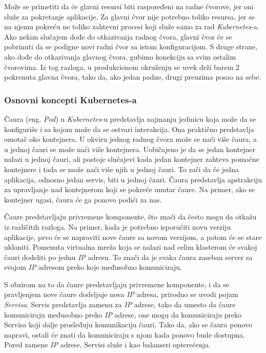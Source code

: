 Može se primetiti da će glavni resursi biti raspoređeni na radne čvorove, jer oni služe za pokretanje 
aplikacije. Za glavni čvor nije potrebno toliko resursa, jer se na njemu pokreću ne toliko zahtevni procesi 
koji služe samo za rad \textit{Kubernetes}-a. Ako nekim slučajem dođe do otkazivanja radnog čvora, glavni čvor 
će se pobrinuti da se podigne novi radni čvor sa istom konfiguracijom. S druge strane, ako dođe do 
otkazivanja glavnog čvora, gubimo konekciju sa svim ostalim čvorovima. Iz tog razloga, u produkcionom 
okruženju se uvek drži barem 2 pokrenuta glavna čvora, tako da, ako jedan padne, drugi preuzima 
posao na sebe.

\subsubsection{Osnovni koncepti Kubernetes-a}
Čaura (eng. {\em Pod}) u \textit{Kubernetes}-u predstavlja najmanju jedinicu koja može da se konfiguriše i sa kojom može da 
se ostvari interakcija. Ona praktično predstavlja omotač oko kontejnera. U okviru jednog radnog čvora 
može se naći više čaura, a u jednoj čauri se može naći više kontejnera. Uobičajeno je da se jedan 
kontejner nalazi u jednoj čauri, ali postoje slučajevi kada jedan kontejner zahteva pomoćne kontejnere 
i tada se može naći više njih u jednoj čauri. To zači da će jedna aplikacija, odnosno jedan servis, 
biti u jednoj čauri. Čaura predstavlja apstrakciju za upravljanje nad kontejnerom koji se pokreće unutar
čaure. Na primer, ako se kontejner ugasi, čaura će ga ponovo podići za nas. 

Čaure predstavljaju privremene komponente, što znači da često mogu da otkažu iz različitih razloga. 
Na primer, kada je potrebno isporučiti novu verziju aplikacije, prvo će se napraviti nove čaure sa 
novom verzijom, a potom će se stare ukloniti. Pomenuta virtualna mreža koja se nalazi nad celim 
klasterom će svakoj čauri dodeliti po jednu \textit{IP} adresu. To znači da je svaka čaura zaseban server sa 
svojom \textit{IP} adresom preko koje međusobno komuniciraju.

S obzirom na to da čaure predstavljaju privremene komponente, i da se pravljenjem nove čaure dodeljuje 
nova \textit{IP} adresa, prirodno se uvodi pojam {\em Servisa}. Servis predstavlja zamenu za \textit{IP} adrese, tako 
da umesto da čaure komuniciraju međusobno preko \textit{IP} adrese, one mogu da komuniciraju preko Servisa 
koji dalje prosleđuju komunikaciju čauri. Tako da, ako se čaura ponovo napravi, ostali će znati da komuniciraju 
s njom kada ponovo bude dostupna. Pored zamene \textit{IP} adrese, Servisi služe i kao balanseri opterećenja. 

